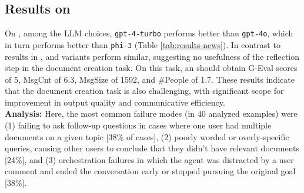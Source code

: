 \subsection{Results on \datanews{}}
On \datanews{}, among the LLM choices, \texttt{gpt-4-turbo} performs better than \texttt{gpt-4o}, which in turn performs better than \texttt{phi-3} (Table \ref{tab:results-news}). In contrast to results in \dataspider{}, \reactagent{} and \noreflectionagent{} variants perform similar, suggesting no usefulness of the reflection step in the document creation task. 
On this task, an \idealagent{} should obtain G-Eval scores of 5, MsgCnt of 6.3, MsgSize of 1592, and \#People of 1.7.
These results indicate that the document creation task is also challenging, with significant scope for improvement in output quality and communicative efficiency.
\\


\noindent \textbf{Analysis:} Here, the most common failure modes (in 40 analyzed examples) were (1) failing to ask follow-up questions in cases where one user had multiple documents on a given topic [38\% of cases], (2) poorly worded or overly-specific queries, causing other users to conclude that they didn’t have relevant documents [24\%], and (3) orchestration failures in which the agent was distracted by a user comment and ended the conversation early or stopped pursuing the original goal [38\%].






